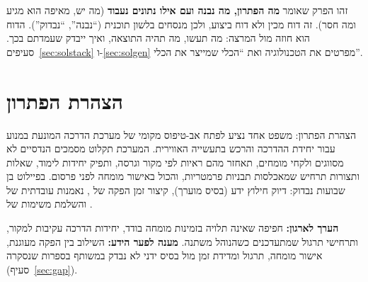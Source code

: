 \begin{pcguide}
זהו הפרק שאומר \textbf{מה הפתרון, מה נבנה ועם אילו נתונים נעבוד} (מה יש, מאיפה הוא מגיע ומה חסר). זה דוח מכין ולא דוח ביצוע, ולכן
מנסחים בלשון תוכנית (“נבנה”, “נבדוק”). הדוח הוא חוזה מול המרצה: מה תעשו, מה תהיה התוצאה, ואיך ייבדק שעמדתם בכך.
סעיפים~\ref{sec:solstack} ו-\ref{sec:solgen} מפרטים את הטכנולוגיה ואת “הכלי שמייצר את הכלי”.
\end{pcguide}

\section{הצהרת הפתרון}\label{sec:solstate}
\begin{pcbox}[pcGood]{הצהרת הפתרון: משפט אחד}
נציע לפתח אב-טיפוס מקומי של מערכת הדרכה המונעת במנוע \textbf{} עבור יחידת ההדרכה והרכש בתעשייה האווירית. המערכת תקלוט מסמכים הנדסיים
לא מסווגים ולקחי מומחים, תאחזר מהם ראיות לפי מקור וגרסה, ותפיק יחידות לימוד, שאלות ותצורות תרחיש  שמאכלסות תבניות
\threeD{} פרמטריות, והכול באישור מומחה לפני פרסום. בפיילוט בן  שבועות נבדוק: דיוק חילוץ ידע  (בסיס מוערך), קיצור זמן
הפקה של , נאמנות עובדתית של  והשלמת משימות \threeD{} של .
\end{pcbox}
\textbf{הערך לארגון:} חפיפה שאינה תלויה בזמינות מומחה בודד, יחידות הדרכה עקיבות למקור, ותרחישי תרגול שמתעדכנים כשהנוהל משתנה.
\textbf{מענה לפער הידע:} השילוב בין הפקה מעוגנת, אישור מומחה, תרגול \threeDadj{} ומדידת זמן מול בסיס ידני לא נבדק במשותף בספרות שנסקרה (סעיף~\ref{sec:gap}).


